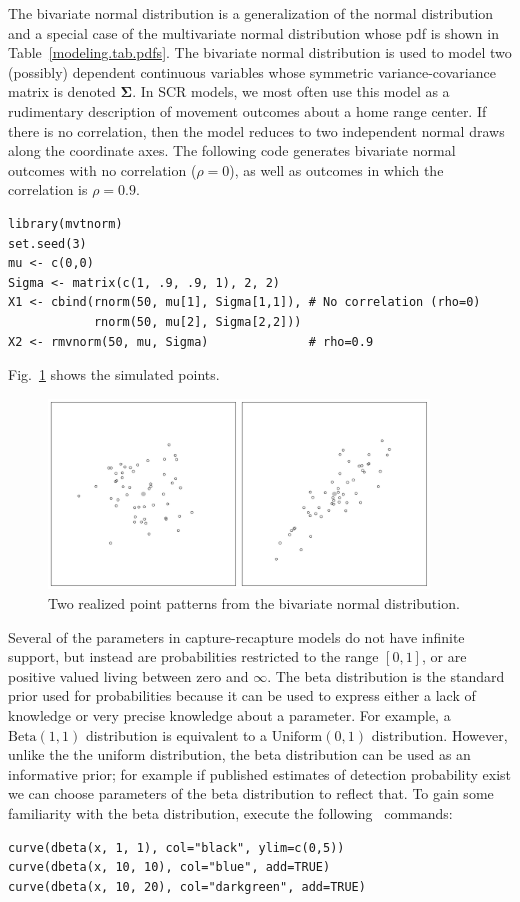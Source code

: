 The bivariate normal distribution is a generalization of the
normal distribution and a special case of the multivariate normal
distribution whose pdf is shown in Table~\ref{modeling.tab.pdfs}. The
bivariate normal distribution is used to model two (possibly) dependent
continuous variables whose symmetric variance-covariance matrix is
denoted $\bm{\Sigma}$.
In SCR models, we most often use this model as
a rudimentary description of movement outcomes about a home range
center. If there is no correlation, then the model reduces to
two independent normal draws along the coordinate axes. The following
code generates bivariate normal
outcomes with no correlation ($\rho=0$), as well
as outcomes in which the correlation is $\rho=0.9$.
\begin{verbatim}
library(mvtnorm)
set.seed(3)
mu <- c(0,0)
Sigma <- matrix(c(1, .9, .9, 1), 2, 2)
X1 <- cbind(rnorm(50, mu[1], Sigma[1,1]), # No correlation (rho=0)
            rnorm(50, mu[2], Sigma[2,2]))
X2 <- rmvnorm(50, mu, Sigma)              # rho=0.9
\end{verbatim}
Fig.~\ref{modeling.fig.bvn} shows the simulated points.
\begin{figure}
  \centering
  \includegraphics[width=0.9\textwidth]{Ch2/figs/bvn}
  \caption{Two realized point patterns from the bivariate normal distribution. }
  \label{modeling.fig.bvn}
\end{figure}

Several of the parameters in capture-recapture models do not have
infinite support, but instead are
probabilities restricted to the range $[0,1]$, or are positive valued
living between zero and $\infty$. The beta distribution is the
standard prior used for probabilities because it can be used to express either a
lack of knowledge or very precise knowledge about a
parameter. For example, a $\text{Beta}(1,1)$ distribution is
equivalent to a $\text{Uniform}(0, 1)$ distribution. However, unlike the
the uniform distribution, the beta distribution can be used as an
informative prior; for example if published estimates of detection
probability exist we can choose parameters of the beta distribution to
reflect that. To gain some familiarity with the beta
distribution, execute the following \R~commands:
\begin{verbatim}
curve(dbeta(x, 1, 1), col="black", ylim=c(0,5))
curve(dbeta(x, 10, 10), col="blue", add=TRUE)
curve(dbeta(x, 10, 20), col="darkgreen", add=TRUE)
\end{verbatim}

